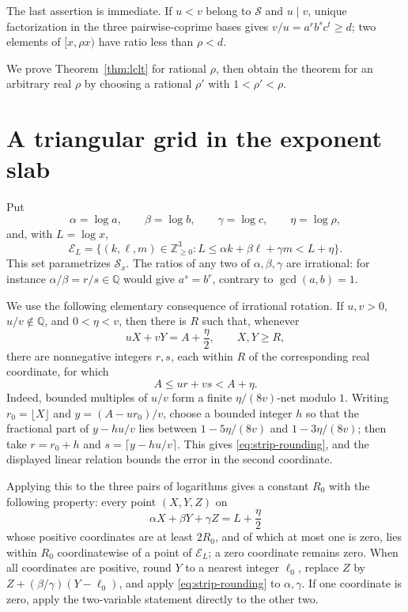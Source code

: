 \documentclass[10pt,reqno]{amsart}
\newcommand{\Nzero}{\mathbb Z_{\ge 0}}
\newcommand{\Sg}{\mathcal S}
\newcommand{\Sx}{\mathcal S_x}
\newcommand{\Eset}{\mathcal E}
\begin{document}
The last assertion is immediate.  If $u<v$ belong to $\Sg$ and $u\mid v$,
unique factorization in the three pairwise-coprime bases gives
$v/u=a^r b^s c^t\ge d$; two elements of $[x,\rho x)$ have ratio less than
$\rho<d$.

We prove Theorem~\ref{thm:lclt} for rational $\rho$, then obtain the theorem for
an arbitrary real $\rho$ by choosing a rational $\rho'$ with
$1<\rho'<\rho$.

\section{A triangular grid in the exponent slab}

Put
\[
 \alpha=\log a,\qquad \beta=\log b,\qquad \gamma=\log c,
 \qquad \eta=\log\rho,
\]
and, with $L=\log x$,
\[
 \Eset_L=\{(k,\ell,m)\in\Nzero^3:
 L\le \alpha k+\beta\ell+\gamma m<L+\eta\}.
\]
This set parametrizes $\Sx$.  The ratios of any two of
$\alpha,\beta,\gamma$ are irrational: for instance
$\alpha/\beta=r/s\in\mathbb Q$ would give $a^s=b^r$, contrary to
$\gcd(a,b)=1$.

We use the following elementary consequence of irrational rotation.  If
$u,v>0$, $u/v\notin\mathbb Q$, and $0<\eta<v$, then there is $R$ such that,
whenever
\[
 uX+vY=A+\frac\eta2,\qquad X,Y\ge R,
\]
there are nonnegative integers $r,s$, each within $R$ of the corresponding
real coordinate, for which
\begin{equation}\label{eq:strip-rounding}
 A\le ur+vs<A+\eta.
\end{equation}
Indeed, bounded multiples of $u/v$ form a finite $\eta/(8v)$-net modulo $1$.
Writing $r_0=\lfloor X\rfloor$ and $y=(A-ur_0)/v$, choose a bounded integer
$h$ so that the fractional part of $y-hu/v$ lies between
$1-5\eta/(8v)$ and $1-3\eta/(8v)$; then take
$r=r_0+h$ and $s=\lceil y-hu/v\rceil$.  This gives
\eqref{eq:strip-rounding}, and the displayed linear relation bounds the error
in the second coordinate.

Applying this to the three pairs of logarithms gives a constant $R_0$ with the
following property: every point $(X,Y,Z)$ on
\begin{equation}\label{eq:central-plane}
 \alpha X+\beta Y+\gamma Z=L+\frac\eta2
\end{equation}
whose positive coordinates are at least $2R_0$, and of which at most one is
zero, lies within $R_0$ coordinatewise of a point of $\Eset_L$; a zero
coordinate remains zero.  When all coordinates are positive, round $Y$ to a
nearest integer $\ell_0$, replace
$Z$ by $Z+(\beta/\gamma)(Y-\ell_0)$, and apply
\eqref{eq:strip-rounding} to $\alpha,\gamma$.  If one coordinate is zero,
apply the two-variable statement directly to the other two.
\end{document}
